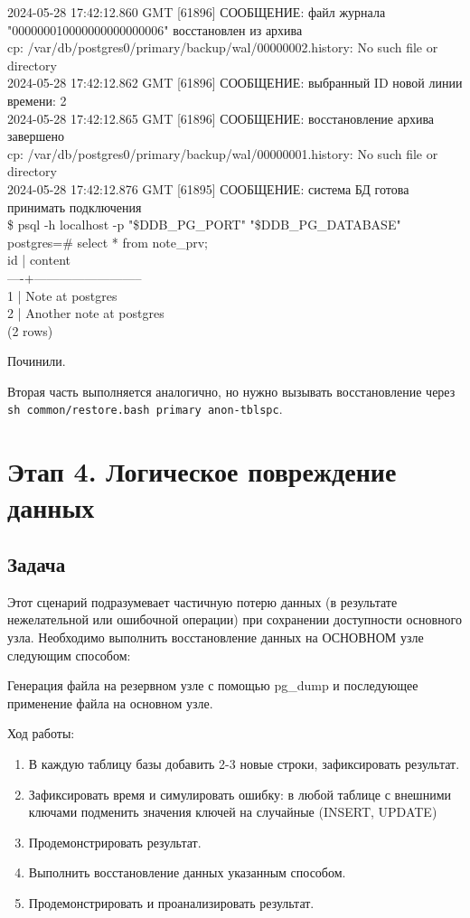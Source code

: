 \documentclass{article}
\begin{document}
{    2024-05-28 17:42:12.860 GMT [61896] СООБЩЕНИЕ:  файл журнала "000000010000000000000006" восстановлен из архива\\
    cp: /var/db/postgres0/primary/backup/wal/00000002.history: No such file or directory\\
    2024-05-28 17:42:12.862 GMT [61896] СООБЩЕНИЕ:  выбранный ID новой линии времени: 2\\
    2024-05-28 17:42:12.865 GMT [61896] СООБЩЕНИЕ:  восстановление архива завершено\\
    cp: /var/db/postgres0/primary/backup/wal/00000001.history: No such file or directory\\
    2024-05-28 17:42:12.876 GMT [61895] СООБЩЕНИЕ:  система БД готова принимать подключения\\
    \$ psql -h localhost -p "\$DDB\_PG\_PORT" "\$DDB\_PG\_DATABASE"\\
    postgres=\# select * from note\_prv;\\
    id |         content          \\
    ----+--------------------------\\
    1 | Note at postgres\\
    2 | Another note at postgres\\
    (2 rows)
}

Починили.

Вторая часть выполняется аналогично, но нужно вызывать восстановление через \texttt{sh common/restore.bash primary anon-tblspc}.

\section{Этап 4. Логическое повреждение данных}

\subsection{Задача}

Этот сценарий подразумевает частичную потерю данных (в результате нежелательной или ошибочной операции) при сохранении доступности основного узла. Необходимо выполнить восстановление данных на ОСНОВНОМ узле следующим способом:

Генерация файла на резервном узле с помощью pg\_dump и последующее применение файла на основном узле.

Ход работы:

\begin{enumerate}
    \item В каждую таблицу базы добавить 2-3 новые строки, зафиксировать результат.
    \item Зафиксировать время и симулировать ошибку: в любой таблице с внешними ключами подменить значения ключей на случайные (INSERT, UPDATE)
    \item Продемонстрировать результат.
    \item Выполнить восстановление данных указанным способом.
    \item Продемонстрировать и проанализировать результат.
\end{enumerate}
\end{document}
